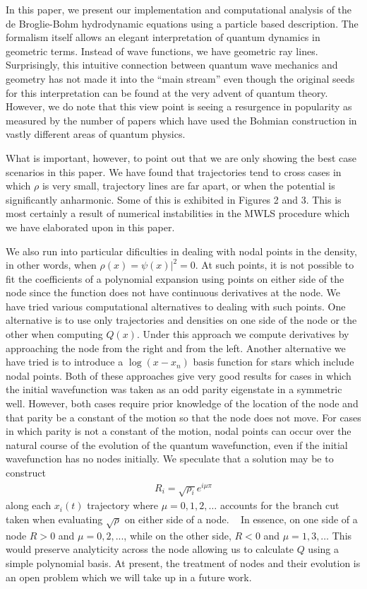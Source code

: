 In this paper, we present our implementation and computational 
analysis of the de Broglie-Bohm hydrodynamic equations using a 
particle based description.  The formalism itself allows an elegant 
interpretation of quantum dynamics in geometric terms.  Instead of 
wave functions, we have geometric ray lines.  Surprisingly, this 
intuitive connection between quantum wave mechanics and geometry has 
not made it into the ``main stream'' even though the original seeds 
for this interpretation can be found at the very advent of quantum 
theory.  However, we do note that this view point is seeing a 
resurgence in popularity as measured by the number of papers which 
have used the Bohmian construction in vastly different areas of 
quantum physics.
  

What is important, however, to point out that we are only showing the 
best case scenarios in this paper.  We have found that trajectories 
tend to cross cases in which $\rho$ is very small, trajectory lines 
are far apart, or when the potential is significantly anharmonic.  
Some of this is exhibited in Figures 2 and 3.  This is most certainly a 
result of numerical instabilities in the MWLS procedure which we have 
elaborated upon in this paper.

We also run into particular dificulties in dealing with nodal points in the 
density, in other words, when $\rho(x)=\psi(x)|^2 = 0$.  At such 
points, it is not possible to fit the coefficients of a polynomial 
expansion using points on either side of the node since the function 
does not have continuous derivatives at the node.  We have tried 
various computational alternatives to dealing with such points.  One 
alternative is to use only trajectories and densities on one side of the 
node or the other when computing $Q(x)$.  Under this approach we 
compute derivatives by approaching the node from the right and from 
the left.  Another alternative we have tried is to introduce a 
$\log(x-{x_n})$ basis function for stars which include nodal points.  
Both of these approaches give very good results for cases in which the 
initial wavefunction was taken as an odd parity eigenstate in a 
symmetric well.  However, both cases require prior knowledge of the 
location of the node and that parity be a constant of the motion so 
that the node does not move.  For cases in which parity is not a 
constant of the motion, nodal points can occur over the natural course 
of the evolution of the quantum wavefunction, even if the initial 
wavefunction has no nodes initially.  We speculate that a solution may 
be to construct
\begin{eqnarray}
    R_i = \sqrt{\rho_i}
 e^{i \mu \pi }
    \label{eq:45}  
    \end{eqnarray}
along each $x_i(t)$ trajectory where $\mu = 0,1,2,\ldots$ accounts for 
the branch cut taken when evaluating $\sqrt{\rho}$ on either side of a 
node.  ~\cite{ref24} In essence, on one side of a node $R > 0$ and 
$\mu =0,2,...$, while on the other side, $R< 0$ and $\mu =1,3,\ldots$ 
This would preserve analyticity across the node allowing us to 
calculate $Q$ using a simple polynomial basis.  At present, the 
treatment of nodes and their evolution is an open problem which we 
will take up in a future work.\cite{ref25}


